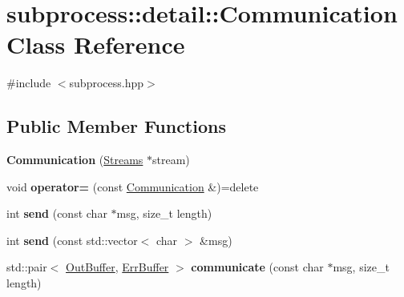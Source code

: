 \hypertarget{classsubprocess_1_1detail_1_1Communication}{}\section{subprocess\+:\+:detail\+:\+:Communication Class Reference}
\label{classsubprocess_1_1detail_1_1Communication}


{\ttfamily \#include $<$subprocess.\+hpp$>$}

\subsection*{Public Member Functions}
\begin{DoxyCompactItemize}
\item 
\mbox{\label{classsubprocess_1_1detail_1_1Communication_a0f87a58d37557e7418bba75687980a3c}} 
{\bfseries Communication} (\hyperlink{classsubprocess_1_1detail_1_1Streams}{Streams} $\ast$stream)
\item 
\mbox{\label{classsubprocess_1_1detail_1_1Communication_a333d99ade2e7d8be6c38e032f0e3916b}} 
void {\bfseries operator=} (const \hyperlink{classsubprocess_1_1detail_1_1Communication}{Communication} \&)=delete
\item 
\mbox{\label{classsubprocess_1_1detail_1_1Communication_a54fd4dc03ae248132f46689e2b004358}} 
int {\bfseries send} (const char $\ast$msg, size\+\_\+t length)
\item 
\mbox{\label{classsubprocess_1_1detail_1_1Communication_a63c33aca25545c9d37db6a546a86f632}} 
int {\bfseries send} (const std\+::vector$<$ char $>$ \&msg)
\item 
\mbox{\label{classsubprocess_1_1detail_1_1Communication_a8c17c404bf117b7d6d947e4ac297e40f}} 
std\+::pair$<$ \hyperlink{classsubprocess_1_1Buffer}{Out\+Buffer}, \hyperlink{classsubprocess_1_1Buffer}{Err\+Buffer} $>$ {\bfseries communicate} (const char $\ast$msg, size\+\_\+t length)
\item 
\mbox{\label{classsubprocess_1_1detail_1_1Communication_a6ed126bc2297ab25edb5c69085b56280}} 

\end{DoxyCompactItemize}
